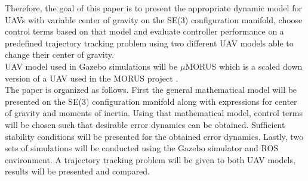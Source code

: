 Therefore, the goal of this paper is to present the appropriate dynamic model for UAVs with variable center of gravity on the SE(3) configuration manifold, choose control terms based on that model and evaluate controller performance on a predefined trajectory tracking problem using two different UAV models able to change their center of gravity. \\
UAV model used in Gazebo simulations will be $\mu$MORUS which is a scaled down version of a UAV used in the MORUS project \cite{MORUSweb}. \\
The paper is organized as follows. First the general mathematical model will be presented on the SE(3) configuration manifold along with expressions for center of gravity and moments of inertia. Using that mathematical model, control terms will be chosen such that desirable error dynamics can be obtained. Sufficient stability conditions will be presented for the obtained error dynamics. Lastly, two sets of simulations will be conducted using the Gazebo simulator and ROS environment. A trajectory tracking problem will be given to both UAV models, results will be presented and compared.